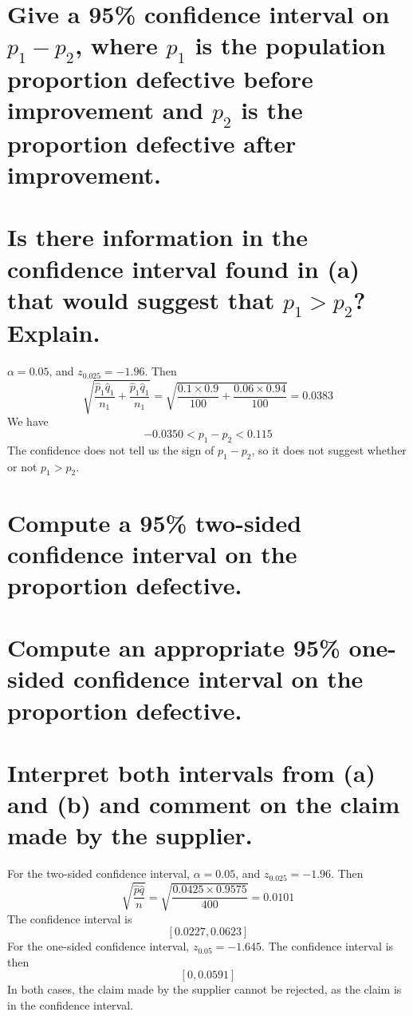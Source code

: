 \documentclass[answers]{exam}
\begin{document}
\begin{questions}
\begin{parts}
    \part{Give a 95\% confidence interval on $p_1 - p_2$, where $p_1$ is the population proportion defective before improvement and $p_2$ is the proportion defective after improvement.}
    \part{Is there information in the confidence interval found in (a) that would suggest that $p_1 > p_2$? Explain.}
\end{parts}

\begin{solution}
    $\alpha = 0.05$, and $z_{0.025} = -1.96$. Then
    $$\sqrt{\frac{\hat p_1\hat q_1}{n_1} + \frac{\hat p_1\hat q_1}{n_1}} = \sqrt{\frac{0.1\times0.9}{100} + \frac{0.06\times0.94}{100}} = 0.0383$$
    We have
    $$-0.0350 < p_1 - p_2 < 0.115$$
    The confidence does not tell us the sign of $p_1-p_2$, so it does not suggest whether or not $p_1 > p_2$.
\end{solution}


\begin{parts}
    \part{Compute a 95\% two-sided confidence interval on the proportion defective.}
    \part{Compute an appropriate 95\% one-sided confidence interval on the proportion defective.}
    \part{Interpret both intervals from (a) and (b) and comment on the claim made by the supplier.}
\end{parts}

\begin{solution}
    For the two-sided confidence interval, $\alpha = 0.05$, and $z_{0.025} = -1.96$. Then
    $$\sqrt{\frac{\hat p\hat q}{n}} = \sqrt{\frac{0.0425\times0.9575}{400}} = 0.0101$$
    The confidence interval is
    $$[0.0227, 0.0623]$$
    For the one-sided confidence interval, $z_{0.05} = -1.645$. The confidence interval is then
    $$[0, 0.0591]$$
    In both cases, the claim made by the supplier cannot be rejected, as the claim is in the confidence interval.
\end{solution}

\end{questions}
\end{document}

